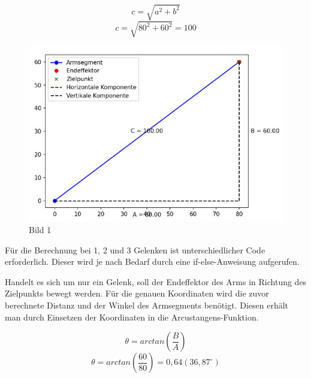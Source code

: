 \documentclass[12pt]{article}
\begin{document}
                \[
                    c = \sqrt{a^2 + b^2}
                \]
                \[
                    c = \sqrt{80^2 + 60^2} = 100
                \]

                \begin{figure}[h]
                    \centering
                    \includegraphics[width = \linewidth]{Bild 1}
                    \caption{Bild 1}
                \end{figure}

                Für die Berechnung bei 1, 2 und 3 Gelenken ist unterschiedlicher Code erforderlich. Dieser wird je
                nach Bedarf durch eine if-else-Anweisung aufgerufen.

                    Handelt es sich um nur ein Gelenk, soll der Endeffektor des Arms in Richtung des Zielpunkts
                    bewegt werden. Für die genauen Koordinaten wird die zuvor berechnete Distanz und der Winkel des
                    Armsegments benötigt. Diesen erhält man durch Einsetzen der Koordinaten in die
                    Arcustangens-Funktion.

                    \[
                        \theta=arctan(\frac{B}{A})
                    \]
                    \[
                        \theta=arctan(\frac{60}{80})=0,64 (36,87^\circ)
                    \]
\end{document}
